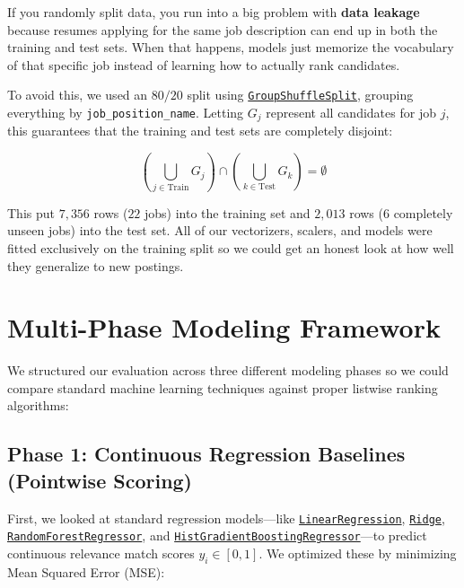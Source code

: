 \documentclass[12pt,a4paper,oneside]{report}
\begin{document}
If you randomly split data, you run into a big problem with \textbf{data leakage} because resumes applying for the same job description can end up in both the training and test sets. When that happens, models just memorize the vocabulary of that specific job instead of learning how to actually rank candidates.

To avoid this, we used an $80/20$ split using \href{https://scikit-learn.org/stable/modules/generated/sklearn.model_selection.GroupShuffleSplit.html}{\texttt{GroupShuffleSplit}}, grouping everything by \texttt{job\_position\_name}. Letting $G_j$ represent all candidates for job $j$, this guarantees that the training and test sets are completely disjoint:

\begin{equation}
\left( \bigcup_{j \in \text{Train}} G_j \right) \cap \left( \bigcup_{k \in \text{Test}} G_k \right) = \emptyset
\end{equation}

This put $7,356$ rows ($22$ jobs) into the training set and $2,013$ rows ($6$ completely unseen jobs) into the test set. All of our vectorizers, scalers, and models were fitted exclusively on the training split so we could get an honest look at how well they generalize to new postings.

\section{Multi-Phase Modeling Framework}

We structured our evaluation across three different modeling phases so we could compare standard machine learning techniques against proper listwise ranking algorithms:

\subsection{Phase 1: Continuous Regression Baselines (Pointwise Scoring)}
First, we looked at standard regression models—like \href{https://scikit-learn.org/stable/modules/generated/sklearn.linear_model.LinearRegression.html}{\texttt{LinearRegression}}, \href{https://scikit-learn.org/stable/modules/generated/sklearn.linear_model.Ridge.html}{\texttt{Ridge}}, \href{https://scikit-learn.org/stable/modules/generated/sklearn.ensemble.RandomForestRegressor.html}{\texttt{RandomForestRegressor}}, and \href{https://scikit-learn.org/stable/modules/generated/sklearn.ensemble.HistGradientBoostingRegressor.html}{\texttt{HistGradientBoostingRegressor}}—to predict continuous relevance match scores $y_i \in [0, 1]$. We optimized these by minimizing Mean Squared Error (MSE):
\end{document}
